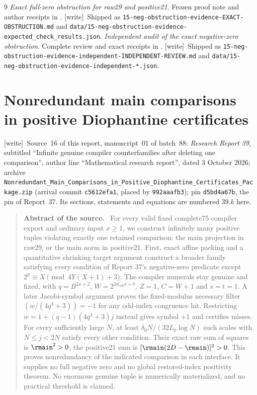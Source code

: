 \documentclass[11pt,letterpaper]{article}
\newcommand{\fupR}{0}
\renewcommand{\thesection}{\fupR.\arabic{section}}
\renewcommand{\theHsection}{\fupR.\arabic{section}}
\newcommand{\fupstart}[2]{%
  \renewcommand{\fupR}{#1}\setcounter{section}{0}\setcounter{equation}{0}%
  \renewcommand{\thesection}{\fupR.\arabic{section}}%
  \renewcommand{\theHsection}{\fupR.\arabic{section}}%
  \renewcommand{\fuphead}{#2}}
\newcommand{\fuphead}{Front matter}
\theoremstyle{definition}\newtheorem{definition}[theorem]{Definition}
\theoremstyle{remark}\newtheorem{remark}[theorem]{Remark}
\newcommand{\code}[1]{\texttt{\detokenize{#1}}}
\newcommand{\wtag}{\textup{[write]}}
\newenvironment{sourceabstract}{\par\begin{quote}\small\textbf{Abstract of the source.}\ }{\end{quote}}
\newcommand{\rw}[1]{\nolinkurl{#1}}%
\begin{document}
\begin{thebibliography}{9}
\emph{Exact full-zero obstruction for raw29 and positive21}. Frozen proof note and author receipts in \code{evidence/}. \wtag\ Shipped as \rw{15-neg-obstruction-evidence-EXACT-OBSTRUCTION.md} and \rw{data/15-neg-obstruction-evidence-expected_check_results.json}.
\emph{Independent audit of the exact negative-zero obstruction}. Complete review and exact receipts in \code{evidence/independent/}. \wtag\ Shipped as \rw{15-neg-obstruction-evidence-independent-INDEPENDENT-REVIEW.md} and \rw{data/15-neg-obstruction-evidence-independent-*.json}.
\end{thebibliography}

\clearpage
\fupstart{39}{Part VI: Report 39}
\part{Nonredundant main comparisons in positive Diophantine certificates}\label{fup:part:nr}
\noindent\wtag\ Source~16 of this report, manuscript~01 of batch~88: \emph{Research Report 39}, subtitled ``Infinite genuine compiler counterfamilies after deleting one comparison'', author line ``Mathematical research report'', dated 3 October 2026; archive \rw{Nonredundant_Main_Comparisons_in_Positive_Diophantine_Certificates_Package.zip} (arrival commit \texttt{c5612efa1}, placed by \texttt{992aaafb3}); pin \texttt{d5bd4a67b}, the pin of Report~37. Its sections, statements and equations are numbered 39.$k$ here.
\begin{sourceabstract}
For every valid fixed complete75 compiler export and ordinary input $x\ge1$, we construct infinitely many positive tuples violating exactly one retained comparison: the main projection in raw29, or the main norm in positive21. First, exact affine packing and a quantitative shrinking target argument construct a broader family satisfying every condition of Report 37's negative-zero predicate except $2^p\equiv X\pmod{4Y(X+1)+3}$. The compiler numerals stay genuine and fixed, with $q=B^{2x+2}$, $W=2^{2d_{\mathrm{cell}}x+b}$, $Z=1$, $C=W+1$ and $s=t=1$. A later Jacobi-symbol argument proves the fixed-modulus necessary filter $(w/(4q^3+3))=-1$ for any odd-index congruence hit. Restricting $w=1+(q-1)(4q^3+3)j$ instead gives symbol $+1$ and certifies misses. For every sufficiently large $N$, at least $\delta_0N/(32L_0\log N)$ such scales with $N\le j<2N$ satisfy every other condition. Their exact raw sum of squares is $\rmain^2>0$; the positive21 sum is $[\rmain(2D-\rmain)]^2>0$. This proves nonredundancy of the indicated comparison in each interface. It supplies no full negative zero and no global restored-index positivity theorem. No enormous genuine tuple is numerically materialized, and no practical threshold is claimed.
\end{sourceabstract}
\end{document}
